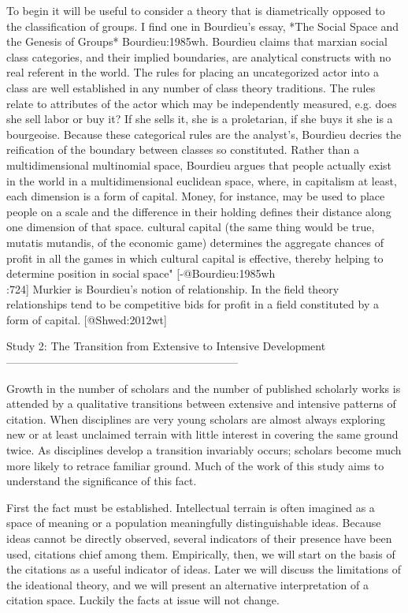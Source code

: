 To begin it will be useful to consider a theory that is diametrically
opposed to the classification of groups. I find one in Bourdieu's essay,
*The Social Space and the Genesis of Groups* {\*Bourdieu:1985wh}.
Bourdieu claims that marxian social class categories, and their implied
boundaries, are analytical constructs with no real referent in the
world. The rules for placing an uncategorized actor into a class are
well established in any number of class theory traditions. The rules
relate to attributes of the actor which may be independently measured,
e.g. does she sell labor or buy it? If she sells it, she is a
proletarian, if she buys it she is a bourgeoise. Because these
categorical rules are the analyst's, Bourdieu decries the reification of
the boundary between classes so constituted. Rather than a
multidimensional multinomial space, Bourdieu argues that people actually
exist in the world in a multidimensional euclidean space, where, in
capitalism at least, each dimension is a form of capital. Money, for
instance, may be used to place people on a scale and the difference in
their holding defines their distance along one dimension of that space.
cultural capital (the same thing would be true, mutatis mutandis, of the
economic game) determines the aggregate chances of profit in all the
games in which cultural capital is effective, thereby helping to
determine position in social space" [-@Bourdieu:1985wh\\:724] Murkier is
Bourdieu's notion of relationship. In the field theory relationships
tend to be competitive bids for profit in a field constituted by a form
of capital. [@Shwed:2012wt]

Study 2: The Transition from Extensive to Intensive Development
---------------------------------------------------------------

Growth in the number of scholars and the number of published scholarly
works is attended by a qualitative transitions between extensive and
intensive patterns of citation. When disciplines are very young scholars
are almost always exploring new or at least unclaimed terrain with
little interest in covering the same ground twice. As disciplines
develop a transition invariably occurs; scholars become much more likely
to retrace familiar ground. Much of the work of this study aims to
understand the significance of this fact.

First the fact must be established. Intellectual terrain is often
imagined as a space of meaning or a population meaningfully
distinguishable ideas. Because ideas cannot be directly observed,
several indicators of their presence have been used, citations chief
among them. Empirically, then, we will start on the basis of the
citations as a useful indicator of ideas. Later we will discuss the
limitations of the ideational theory, and we will present an alternative
interpretation of a citation space. Luckily the facts at issue will not
change.

